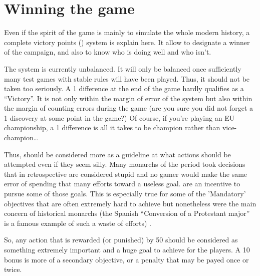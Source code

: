 
\chapter{Winning the game}\label{chapter:Victories}



\begin{designnote}
  Even if the spirit of the game is mainly to simulate the whole modern
  history, a complete victory points (\VPs) system is explain here. It allow
  to designate a winner of the campaign, and also to know who is doing well
  and who isn't.

  The \VPs system is currently unbalanced. It will only be balanced once
  sufficiently many test games with stable rules will have been played. Thus,
  it should not be taken too seriously. A 1 \VP difference at the end of the
  game hardly qualifies as a ``Victory''. It is not only within the margin of
  error of the system but also within the margin of counting errors during the
  game (are you sure you did not forget a 1 \VP discovery at some point in the
  game?) Of course, if you're playing an EU championship, a 1 \VP difference
  is all it takes to be champion rather than vice-champion\ldots

  Thus, \VPs should be considered more as a guideline at what actions should
  be attempted even if they seem silly. Many monarchs of the period took
  decisions that in retrospective are considered stupid and no gamer would
  make the same error of spending that many efforts toward a useless
  goal. \VPs are an incentive to pursue some of those goals. This is
  especially true for some of the 'Mandatory' objectives that are often
  extremely hard to achieve but nonetheless were the main concern of
  historical monarchs (the Spanish ``Conversion of a Protestant major'' is a
  famous example of such a waste of efforts) .

  So, any action that is rewarded (or punished) by 50 \VPs should be
  considered as something extremely important and a huge goal to achieve for
  the players. A 10 \VPs bonus is more of a secondary objective, or a penalty
  that may be payed once or twice.
\end{designnote}

